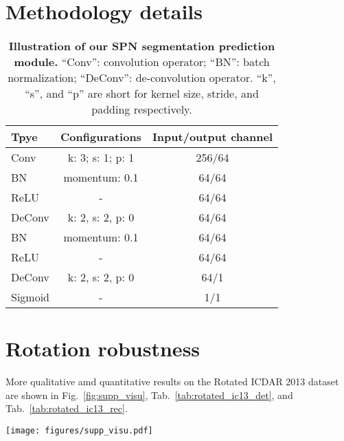 \documentclass[runningheads]{llncs}
\begin{document}
\clearpage



\clearpage
\appendix
\section{Methodology details}

\begin{table}[ht]
    \setlength{\tabcolsep}{8.0pt}
    \centering
    \caption{\textbf{Illustration of our SPN segmentation prediction module.} ``Conv'': convolution operator; ``BN'': batch normalization; ``DeConv'': de-convolution operator. ``k'', ``s'', and ``p'' are short for kernel size, stride, and padding respectively.}
    \begin{tabularx}{0.65\linewidth}{@{}lcc@{}}
    \toprule
    Tpye    & Configurations           & Input/output channel \\ 
    \midrule
    Conv    & k: 3; s: 1; p: 1         & 256/64               \\ 
    BN      & momentum: 0.1 & 64/64                \\ 
    ReLU    & -                        & 64/64                \\ 
    DeConv  & k: 2, s: 2, p: 0         & 64/64                \\ 
    BN      & momentum: 0.1 & 64/64                \\ 
    ReLU    & -                        & 64/64                \\ 
    DeConv  & k: 2, s: 2, p: 0         & 64/1                 \\ 
    Sigmoid & -                        & 1/1                  \\ 
    \bottomrule
    \end{tabularx}
    \label{tab:predict}
\end{table}

\section{Rotation robustness}
More qualitative amd quantitative results on the Rotated ICDAR 2013 dataset are shown in Fig.~\ref{fig:supp_visu}, Tab.~\ref{tab:rotated_ic13_det}, and Tab.~\ref{tab:rotated_ic13_rec}.

\begin{figure*}[ht]
    \centering
    \texttt{[image: figures/supp\_visu.pdf]}
    \caption{\textbf{Qualitative results on the Rotated ICDAR 2013 dataset.} The rotating angles are $15^\circ$, $30^\circ$, $45^\circ$, $60^\circ$ , $75^\circ$, and $90^\circ$ for the columns from left to right.}
    \label{fig:supp_visu}
\end{figure*}
\end{document}
